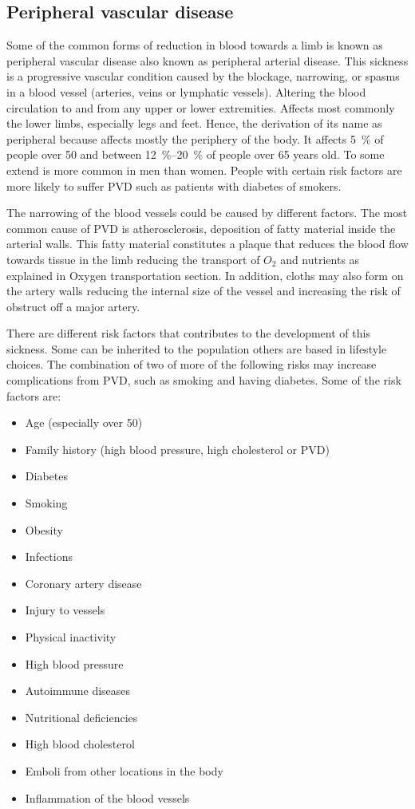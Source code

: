 \subsection{Peripheral vascular disease}
Some of the common forms of reduction in blood towards a limb is known as peripheral vascular disease also known as peripheral arterial disease. This sickness is a progressive vascular condition caused by the blockage, narrowing, or spasms in a blood vessel (arteries, veins or lymphatic vessels). Altering the blood circulation to and from any upper or lower extremities. Affects most commonly the lower limbs, especially legs and feet. Hence, the derivation of its name as peripheral because affects mostly the periphery of the body. It affects \SI{5}{\percent} of people over \num{50} and between \SIrange{12}{20}{\percent} of people over 65 years old. To some extend is more common in men than women. People with certain risk factors are more likely to suffer PVD  such as patients with diabetes of smokers.  

The narrowing of the blood vessels could be caused by different factors. The most common cause of PVD is atherosclerosis, deposition of fatty material inside the arterial walls. This fatty material constitutes a plaque that reduces the blood flow towards tissue in the limb reducing the transport of $O_2$ and nutrients as explained in Oxygen transportation section. In addition, cloths may also form on the artery walls reducing the internal size of the vessel and increasing the risk of obstruct off a major artery. 

There are different risk factors that contributes to the development of this sickness. Some can be inherited to the population others are based in lifestyle choices. The combination of two of more of the following risks may increase complications from PVD, such as smoking and having diabetes. Some of the risk factors are:

\begin{itemize}[noitemsep]
	\item Age (especially over \num{50})
	\item Family history (high blood pressure, high cholesterol or PVD)
	\item Diabetes
	\item Smoking
	\item Obesity
	\item Infections
	\item Coronary artery disease
	\item Injury to vessels
	\item Physical inactivity
	\item High blood pressure
	\item Autoimmune diseases
	\item Nutritional deficiencies
	\item High blood cholesterol
	\item Emboli from other locations in the body
	\item Inflammation of the blood vessels
\end{itemize}

